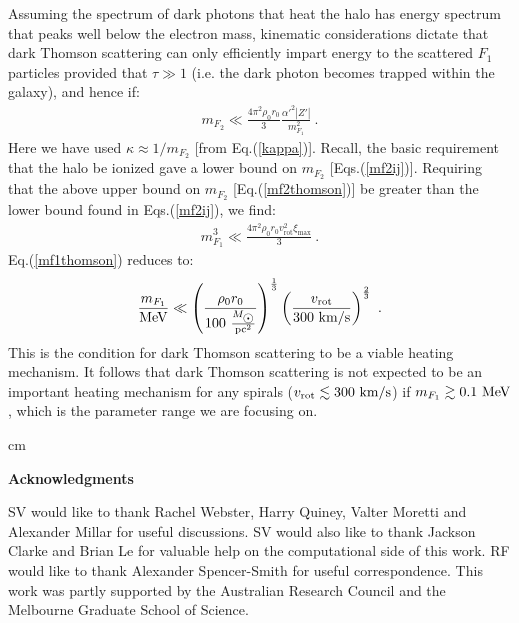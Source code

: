 \documentclass[12pt]{article}
\begin{document}
{{Assuming the spectrum of dark photons that heat the halo has energy spectrum that peaks well below the electron mass, kinematic considerations dictate that dark Thomson scattering can only efficiently impart energy to the scattered $F_1$ particles provided that $\tau \gg 1$ (i.e. the dark photon becomes trapped within the galaxy), and hence if:
%
\begin{eqnarray}
m _{F_2} \ll \frac{4\pi ^2\rho _0r _0}{3}\frac{{\alpha '} ^2|Z'|}{m _{F_1} ^2} \ .
\label{mf2thomson}
\end{eqnarray}
%
Here we have used $\kappa \approx 1/m _{F_2}$ [from Eq.(\ref{kappa})]. Recall, the basic requirement that the halo be ionized gave a lower bound on $m _{F_2}$ [Eqs.(\ref{mf2ij})]. Requiring that the above upper bound on $m _{F_2}$ [Eq.(\ref{mf2thomson})] be greater than the lower bound found in Eqs.(\ref{mf2ij}), we find:
%
\begin{eqnarray}
m _{F_1} ^3 \ll \frac{4\pi ^2\rho _0r _0v _{\text{rot}} ^2\xi _{\max}}{3} \ .
\label{mf1thomson}
\end{eqnarray}
%
Eq.(\ref{mf1thomson}) reduces to:
%
\begin{eqnarray}
\frac{m _{F_1}}{{\rm MeV}} \ll \left ( \frac{\rho _0r _0}{100 \ \frac{M _{\astrosun}}{{\rm pc ^2}}} \right ) ^{\frac{1}{3}}\left ( \frac{v _{\text{rot}}}{300 \ \rm km/s} \right )^{\frac{2}{3}} \ .
\end{eqnarray}
%
This is the condition for dark Thomson scattering to be a viable heating mechanism. It follows that dark Thomson scattering is not expected to be an important heating mechanism for any spirals ($v _{\text{rot}} \lesssim 300 \ \rm km/s$) if $m _{F_1} \gtrsim 0.1 \ \rm MeV$, which is the parameter range we are focusing on.

 cm

\begin{flushleft}

{\Large \bf Acknowledgments}

\end{flushleft}

\vskip 0.2cm
\noindent
SV would like to thank Rachel Webster, Harry Quiney, Valter Moretti and Alexander Millar for useful discussions. SV would also like to thank Jackson Clarke and Brian Le for valuable help on the computational side of this work. RF would like to thank Alexander Spencer-Smith
for useful correspondence. This work was partly supported by the Australian Research Council and the Melbourne Graduate School of Science.

}}
\end{document}
